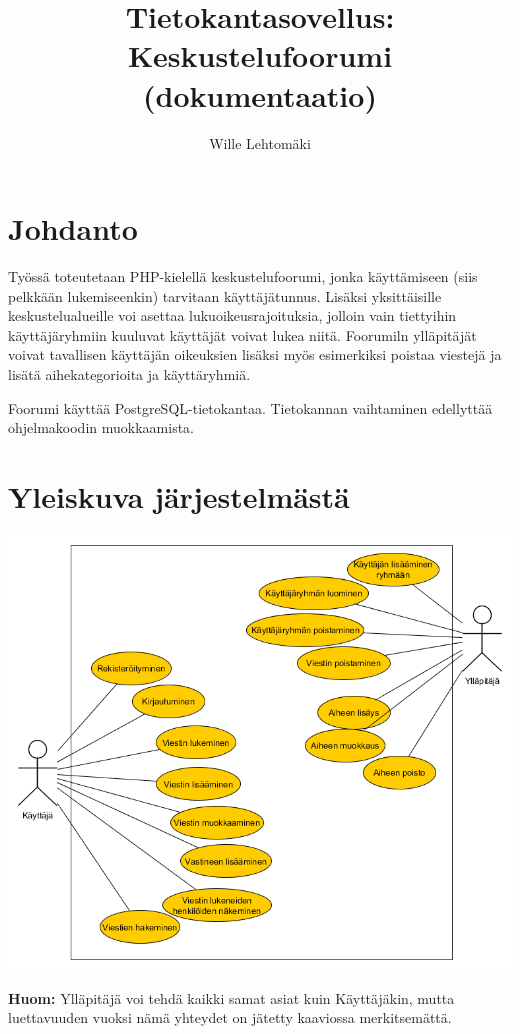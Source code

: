 \documentclass[12pt,a4paper,leqno]{report}
\title{Tietokantasovellus: Keskustelufoorumi (dokumentaatio)}
\author{Wille Lehtomäki}
\date{}
\begin{document}
\maketitle

\tableofcontents

\chapter{Johdanto}\label{johd}

Työssä toteutetaan PHP-kielellä keskustelufoorumi, jonka käyttämiseen (siis pelkkään lukemiseenkin) tarvitaan käyttäjätunnus. Lisäksi yksittäisille keskustelualueille voi asettaa lukuoikeusrajoituksia, jolloin vain tiettyihin käyttäjäryhmiin kuuluvat käyttäjät voivat lukea niitä. Foorumiln ylläpitäjät voivat tavallisen käyttäjän oikeuksien lisäksi myös esimerkiksi poistaa viestejä ja lisätä aihekategorioita ja käyttäryhmiä.

Foorumi käyttää PostgreSQL-tietokantaa. Tietokannan vaihtaminen edellyttää ohjelmakoodin muokkaamista.

\chapter{Yleiskuva järjestelmästä}

\begin{center}
\includegraphics[scale=0.5]{kayttp}
\end{center}

\noindent \textbf{Huom:} Ylläpitäjä voi tehdä kaikki samat asiat kuin Käyttäjäkin, mutta luettavuuden vuoksi nämä yhteydet on jätetty kaaviossa merkitsemättä.
\end{document}
